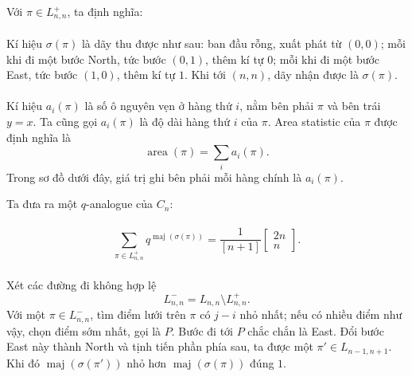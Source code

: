 \documentclass[11pt]{article}
\begin{document}
Với \(\pi\in L^+_{n,n}\), ta định nghĩa:

\paragraph{}
Kí hiệu \(\sigma(\pi)\) là dãy thu được như sau: ban đầu rỗng, xuất phát từ
\((0,0)\); mỗi khi đi một bước North, tức bước \((0,1)\), thêm kí tự \(0\);
mỗi khi đi một bước East, tức bước \((1,0)\), thêm kí tự \(1\). Khi tới
\((n,n)\), dãy nhận được là \(\sigma(\pi)\).

\paragraph{}
Kí hiệu \(a_i(\pi)\) là số ô nguyên vẹn ở hàng thứ \(i\), nằm bên phải
\(\pi\) và bên trái \(y=x\). Ta cũng gọi \(a_i(\pi)\) là độ dài hàng thứ \(i\)
của \(\pi\). Area statistic của \(\pi\) được định nghĩa là
\[
  \operatorname{area}(\pi)=\sum_i a_i(\pi).
\]
Trong sơ đồ dưới đây, giá trị ghi bên phải mỗi hàng chính là \(a_i(\pi)\).


Ta đưa ra một \(q\)-analogue của \(C_n\):

\paragraph{}
\[
  \sum_{\pi\in L^+_{n,n}}q^{\operatorname{maj}(\sigma(\pi))}
  =
  \frac{1}{[n+1]}
  \left[\begin{matrix}2n\\ n\end{matrix}\right].
\]

\paragraph{}
Xét các đường đi không hợp lệ
\[
  L^-_{n,n}=L_{n,n}\setminus L^+_{n,n}.
\]
Với một \(\pi\in L^-_{n,n}\), tìm điểm lưới trên \(\pi\) có \(j-i\) nhỏ nhất;
nếu có nhiều điểm như vậy, chọn điểm sớm nhất, gọi là \(P\). Bước đi tới
\(P\) chắc chắn là East. Đổi bước East này thành North và tịnh tiến phần phía
sau, ta được một \(\pi'\in L_{n-1,n+1}\). Khi đó
\(\operatorname{maj}(\sigma(\pi'))\) nhỏ hơn
\(\operatorname{maj}(\sigma(\pi))\) đúng \(1\).
\end{document}

